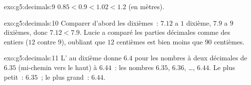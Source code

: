 \begin{solution}{exo:g5:decimals:9}
$0.85 < 0.9 < 1.02 < 1.2$ (en mètres).
\end{solution}

\begin{solution}{exo:g5:decimals:10}
Comparer d'abord les dixièmes~: $7.12$ a $1$ dixième, $7.9$ a $9$
dixièmes, donc $7.12 < 7.9$. Lucie a comparé les parties décimales
comme des entiers ($12$ contre $9$), oubliant que $12$ centièmes
est bien moins que $90$ centièmes.
\end{solution}

\begin{solution}{exo:g5:decimals:11}
L' au dixième donne $6.4$ pour les nombres à deux décimales
de $6.35$ (mi-chemin  vers le haut) à $6.44$~: les nombres
$6.35$, $6.36$, \dots, $6.44$. Le plus petit~: $6.35$~; le plus
grand~: $6.44$.
\end{solution}
